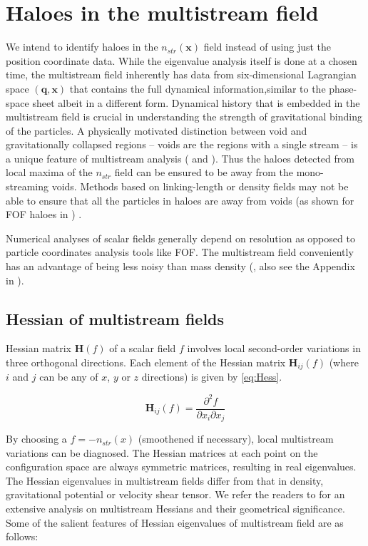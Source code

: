 \section{Haloes in the multistream field}
\label{sec:haloDetection}

We intend to identify haloes in the $n_{str}(\mathbf{x})$ field instead of using just the position coordinate data. While the eigenvalue analysis itself is done at a chosen time, the multistream field inherently has data from six-dimensional Lagrangian space $(\mathbf{q}, \mathbf{x})$ that contains the full dynamical information,similar to the phase-space sheet albeit in a different form. Dynamical history that is embedded in the multistream field is crucial in understanding the strength of gravitational binding of the particles. 
A physically motivated distinction between void and gravitationally collapsed regions -- voids are the regions with a single stream -- is a unique feature of multistream analysis (\citealt{Shandarin2012} and \citealt{Ramachandra2017}). Thus the haloes detected from local maxima of the $n_{str}$ field can be ensured to be away from the mono-streaming voids. Methods based on linking-length or density fields may not be able to ensure that  all the particles in haloes are away from voids (as shown for FOF haloes in \citealt{Ramachandra2017}) . 


Numerical analyses of scalar fields generally depend on resolution as opposed to particle coordinates analysis tools like FOF. The multistream field conveniently has an advantage of being less noisy than mass density (\citealt{Shandarin2012}, also see the Appendix in \citealt{Ramachandra2017} ). 

\subsection{Hessian of multistream fields}


Hessian matrix $\mathbf{H}(f)$ of a scalar field $f$ involves local second-order variations in three orthogonal directions. Each element of the Hessian matrix $\mathbf{H}_{ij}(f)$ (where $i$ and $j$ can be any of $x$, $y$ or $z$ directions) is given by \autoref{eq:Hess}. 

\begin{equation}
\label{eq:Hess}
 \mathbf{H}_{ij}(f) = \frac{\partial^2 f}{\partial x_i \partial x_j}
\end{equation}

By choosing a $f = -n_{str}(x)$ (smoothened if necessary), local multistream variations can be diagnosed. The Hessian matrices at each point on the configuration space are always symmetric matrices, resulting in real eigenvalues. The Hessian eigenvalues in multistream fields differ from that in density, gravitational potential or velocity shear tensor. We refer the readers to \cite{Ramachandra2017} for an extensive analysis on multistream Hessians and their geometrical significance. Some of the salient features of Hessian eigenvalues of multistream field are as follows: 

